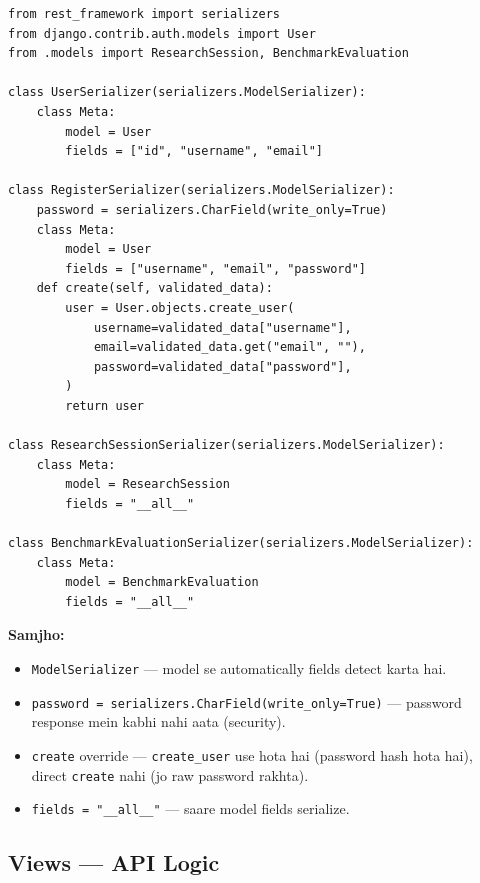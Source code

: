 \documentclass[11pt, a4paper]{article}
\begin{document}
\begin{lstlisting}[style=pythonstyle, caption={backend/api/serializers.py --- Key Parts}]
from rest_framework import serializers
from django.contrib.auth.models import User
from .models import ResearchSession, BenchmarkEvaluation

class UserSerializer(serializers.ModelSerializer):
    class Meta:
        model = User
        fields = ["id", "username", "email"]

class RegisterSerializer(serializers.ModelSerializer):
    password = serializers.CharField(write_only=True)
    class Meta:
        model = User
        fields = ["username", "email", "password"]
    def create(self, validated_data):
        user = User.objects.create_user(
            username=validated_data["username"],
            email=validated_data.get("email", ""),
            password=validated_data["password"],
        )
        return user

class ResearchSessionSerializer(serializers.ModelSerializer):
    class Meta:
        model = ResearchSession
        fields = "__all__"

class BenchmarkEvaluationSerializer(serializers.ModelSerializer):
    class Meta:
        model = BenchmarkEvaluation
        fields = "__all__"
\end{lstlisting}

\begin{codestorybox}
\textbf{Samjho:}
\begin{itemize}
\item \texttt{ModelSerializer} --- model se automatically fields detect karta hai.
\item \texttt{password = serializers.CharField(write\_only=True)} --- password response mein kabhi nahi aata (security).
\item \texttt{create} override --- \texttt{create\_user} use hota hai (password hash hota hai), direct \texttt{create} nahi (jo raw password rakhta).
\item \texttt{fields = "\_\_all\_\_"} --- saare model fields serialize.
\end{itemize}
\end{codestorybox}

\subsection{Views --- API Logic}
\end{document}
